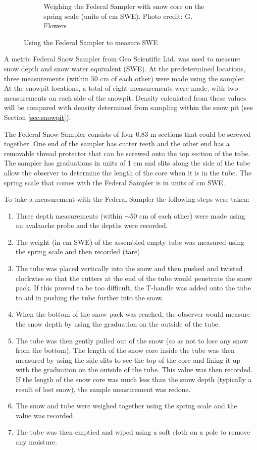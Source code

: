 \documentclass[12pt]{article}
\begin{document}
\begin{figure}
\begin{subfigure}[b]{0.56\textwidth}
        \caption{Weighing the Federal Sampler with snow core on the spring scale (units of cm SWE). Photo credit: G. Flowers}
        \label{photo_swe2}
    \end{subfigure}

    \caption{Using the Federal Sampler to measure SWE}
    \label{photo_swe}
\end{figure}
 
A metric Federal Snow Sampler from Geo Scientific Ltd. was used to measure snow depth and snow water equivalent (SWE). At the predetermined locations, three measurements (within 50 cm of each other) were made using the sampler. At the snowpit locations, a total of eight measurements were made, with two measurements on each side of the snowpit. Density calculated from these values will be compared with density determined from sampling within the snow pit (see Section \ref{sec:snowpit}). 

The Federal Snow Sampler consists of four 0.83 m sections that could be screwed together. One end of the sampler has cutter teeth and the other end has a removable thread protector that can be screwed onto the top section of the tube. The sampler has graduations in units of 1 cm and slits along the side of the tube allow the observer to determine the length of the core when it is in the tube. The spring scale that comes with the Federal Sampler is in units of cm SWE.  

To take a measurement with the Federal Sampler the following steps were taken:
\begin{enumerate}
\item Three depth measurements (within $\sim$50 cm of each other) were made using an avalanche probe and the depths were recorded.
\item The weight (in cm SWE) of the assembled empty tube was measured using the spring scale and then recorded (tare).
\item The tube was placed vertically into the snow and then pushed and twisted clockwise so that the cutters at the end of the tube would penetrate the snow pack. If this proved to be too difficult, the T-handle was added onto the tube to aid in pushing the tube further into the snow. 
\item When the bottom of the snow pack was reached, the observer would measure the snow depth by using the graduation on the outside of the tube.
\item The tube was then gently pulled out of the snow (so as not to lose any snow from the bottom). The length of the snow core inside the tube was then measured by using the side slits to see the top of the core and lining it up with the graduation on the outside of the tube. This value was then recorded. If the length of the snow core was much less than the snow depth (typically a result of lost snow), the sample measurement was redone.
\item The snow and tube were weighed together using the spring scale and the value was recorded.
\item The tube was then emptied and wiped using a soft cloth on a pole to remove any moisture. 
\end{enumerate}
\end{document}
